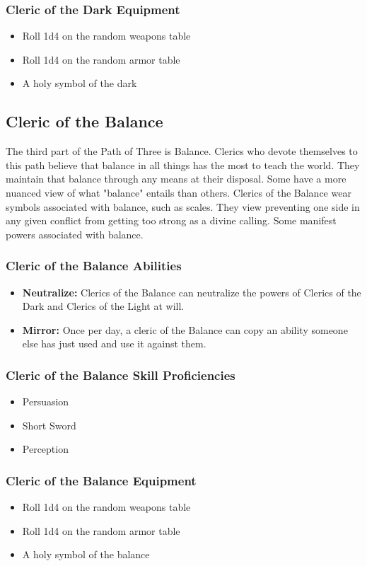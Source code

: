 \begin{multicols}{2}
\subsubsection{Cleric of the Dark Equipment}

\begin{itemize}
  \item Roll 1d4 on the random weapons table
  \item Roll 1d4 on the random armor table
  \item A holy symbol of the dark
\end{itemize}

\subsection{Cleric of the Balance}

The third part of the Path of Three is Balance. Clerics who devote themselves to
this path believe that balance in all things has the most to teach the world.
They maintain that balance through any means at their disposal. Some have a more
nuanced view of what "balance" entails than others. Clerics of the Balance wear
symbols associated with balance, such as scales. They view preventing one side
in any given conflict from getting too strong as a divine calling. Some manifest
powers associated with balance.

\subsubsection{Cleric of the Balance Abilities}

\begin{itemize}
  \item \textbf{Neutralize:} Clerics of the Balance can neutralize the powers of
    Clerics of the Dark and Clerics of the Light at will.
  \item \textbf{Mirror:} Once per day, a cleric of the Balance can copy an ability
    someone else has just used and use it against them.
\end{itemize}

\subsubsection{Cleric of the Balance Skill Proficiencies}

\begin{itemize}
  \item Persuasion
  \item Short Sword
  \item Perception
\end{itemize}

\subsubsection{Cleric of the Balance Equipment}

\begin{itemize}
  \item Roll 1d4 on the random weapons table
  \item Roll 1d4 on the random armor table
  \item A holy symbol of the balance
\end{itemize}

\end{multicols}
